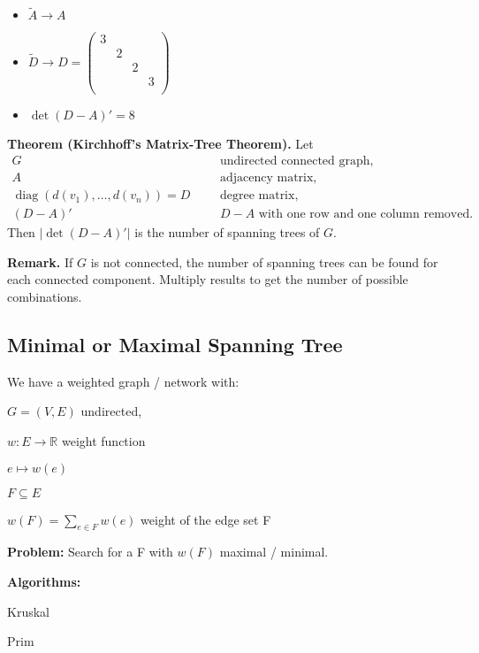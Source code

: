 \begin{itemize}
	\item $\tilde A \rightarrow A$
	\item $\tilde D \rightarrow D =
		\begin{pmatrix}3 \\ & 2 \\ & & 2 \\ & & & 3 \\ \end{pmatrix}$
	\item $\det{(D-A)'} = 8$
\end{itemize}

\textbf{Theorem (Kirchhoff's Matrix-Tree Theorem).}
Let
\begin{align*}
G &&& \text{undirected connected graph,} \\
A &&& \text{adjacency matrix,} \\
\operatorname{diag}(d(v_1),\ldots,d(v_n)) = D &&& \text{degree matrix,} \\
(D-A)' &&& \text{$D-A$ with one row and one column removed.}
\end{align*}
Then $|\det{(D-A)'}|$ is the number of spanning trees of $G$.

\textbf{Remark.} If $G$ is not connected, the number of spanning trees can be
found for each connected component. Multiply results to get the number
of possible combinations.






\subsection{Minimal or Maximal Spanning Tree}
We have a weighted graph / network with:
\begin{compactitem}
  \item $G=(V, E)$ undirected,
  \item $w: E \rightarrow \mathbb{R}$ weight function
  \item $e \mapsto w(e)$
  \item $F\subseteq E$
  \item $w(F) = \sum_{e\in F} w(e)$ weight of the edge set F
\end{compactitem}

\textbf{Problem:} Search for a  F with $w(F)$ maximal / minimal.\\


\textbf{Algorithms:}
\begin{compactitem}
	\item Kruskal
	\item Prim
\end{compactitem}



